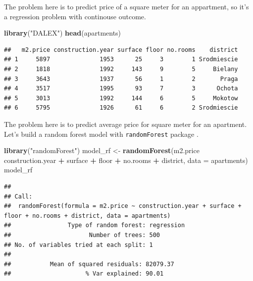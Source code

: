 \documentclass[]{book}
\newenvironment{Shaded}{\begin{snugshade}}{\end{snugshade}}
\newcommand{\DataTypeTok}[1]{\textcolor[rgb]{0.13,0.29,0.53}{#1}}
\newcommand{\KeywordTok}[1]{\textcolor[rgb]{0.13,0.29,0.53}{\textbf{#1}}}
\newcommand{\NormalTok}[1]{#1}
\newcommand{\OperatorTok}[1]{\textcolor[rgb]{0.81,0.36,0.00}{\textbf{#1}}}
\newcommand{\StringTok}[1]{\textcolor[rgb]{0.31,0.60,0.02}{#1}}
\theoremstyle{definition}
\theoremstyle{definition}
\theoremstyle{definition}
\theoremstyle{remark}
\begin{document}
The problem here is to predict price of a square meter for an
appartment, so it's a regression problem with continouse outcome.

\begin{Shaded}
\begin{Highlighting}[]
\KeywordTok{library}\NormalTok{(}\StringTok{"DALEX"}\NormalTok{)}
\KeywordTok{head}\NormalTok{(apartments)}
\end{Highlighting}
\end{Shaded}

\begin{verbatim}
##   m2.price construction.year surface floor no.rooms    district
## 1     5897              1953      25     3        1 Srodmiescie
## 2     1818              1992     143     9        5     Bielany
## 3     3643              1937      56     1        2       Praga
## 4     3517              1995      93     7        3      Ochota
## 5     3013              1992     144     6        5     Mokotow
## 6     5795              1926      61     6        2 Srodmiescie
\end{verbatim}

The problem here is to predict average price for square meter for an
apartment. Let's build a random forest model with \texttt{randomForest}
package \citep{R-randomForest}.

\begin{Shaded}
\begin{Highlighting}[]
\KeywordTok{library}\NormalTok{(}\StringTok{"randomForest"}\NormalTok{)}
\NormalTok{model_rf <-}\StringTok{ }\KeywordTok{randomForest}\NormalTok{(m2.price }\OperatorTok{~}\StringTok{ }\NormalTok{construction.year }\OperatorTok{+}\StringTok{ }\NormalTok{surface }\OperatorTok{+}\StringTok{ }\NormalTok{floor }\OperatorTok{+}\StringTok{ }\NormalTok{no.rooms }\OperatorTok{+}\StringTok{ }\NormalTok{district, }\DataTypeTok{data =}\NormalTok{ apartments)}
\NormalTok{model_rf}
\end{Highlighting}
\end{Shaded}

\begin{verbatim}
## 
## Call:
##  randomForest(formula = m2.price ~ construction.year + surface +      floor + no.rooms + district, data = apartments) 
##                Type of random forest: regression
##                      Number of trees: 500
## No. of variables tried at each split: 1
## 
##           Mean of squared residuals: 82079.37
##                     % Var explained: 90.01
\end{verbatim}
\end{document}
